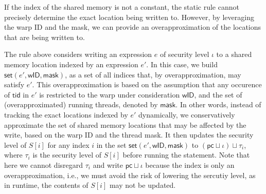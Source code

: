 If the index of the shared memory is not a constant, the static rule cannot precisely determine the exact location being written to. 
% 
However, by leveraging the warp ID and the mask, we can provide an overapproximation of the locations that are being written to.
\begin{mathpar}
    \end{mathpar}
% 
The rule above considers writing an expression $e$ of security level $\iota$ to a shared memory location indexed by an expression $e'$.
%
In this case, we build  $\mathsf{set}(e', \mathsf{wID}, \mathsf{mask})$, as a set of all indices that, by overapproximation, may satisfy $e'$. This overapproximation is based on the assumption that any occurence of $\mathsf{tid}$ in $e'$ is restricted to the warp under consideration $\mathsf{wID}$, and the set of (overapproximated) running threads, denoted by $\mathsf{mask}$.
% 
In other words, instead of tracking the exact locations indexed by $e'$ dynamically, we conservatively approximate the set of shared memory locations that may be affected by the write, based on the warp ID and the thread mask.
%
It then updates the security level of $S[i]$ for any index $i$ in the set $\mathsf{set}(e', \mathsf{wID}, \mathsf{mask})$ to $(\mathsf{pc} \sqcup \iota) \sqcup \tau_i$, where $\tau_i$ is the security level of $S[i]$ before running the statement.
%
Note that here we cannot disregard $\tau_i$ and write $\mathsf{pc} \sqcup \iota$ because the index is only an overapproximation, i.e., we must avoid the risk of lowering the sercutiy level, as in runtime,  the contents of $S[i]$ may not be updated.
%






